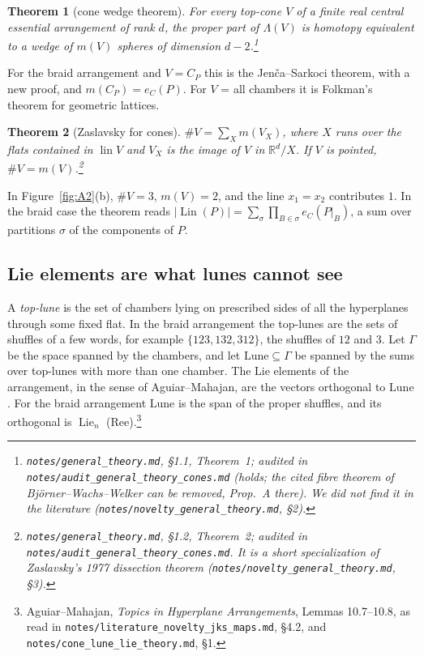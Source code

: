 \documentclass[11pt]{article}
\newtheorem{theorem}{Theorem}
\theoremstyle{definition}
\theoremstyle{remark}
\newcommand{\Lin}{\operatorname{Lin}}
\newcommand{\Lie}{\operatorname{Lie}}
\newcommand{\lin}{\operatorname{lin}}
\newcommand{\Lune}{\mathrm{Lune}}
\newcommand{\src}[1]{\nolinkurl{#1}}
\newcommand{\tagbox}[1]{\leavevmode\marginpar{\raggedright\fbox{\parbox{0.66in}{\centering\scriptsize\sffamily #1}}}}
\newcommand{\PROVEN}{\tagbox{PROVEN\\AUDITED}}
\newcommand{\CITED}{\tagbox{CLASSICAL\\(CITED)}}
\begin{document}
\begin{theorem}[cone wedge theorem]\label{thm:wedge}\PROVEN
For every top-cone $V$ of a finite real central essential arrangement of
rank $d$, the proper part of $\Lambda(V)$ is homotopy equivalent to a wedge
of $m(V)$ spheres of dimension $d-2$.\footnote{\src{notes/general_theory.md},
\S1.1, Theorem~1; audited in \src{notes/audit_general_theory_cones.md}
(holds; the cited fibre theorem of Bj\"orner--Wachs--Welker can be removed,
Prop.~A there). We did not find it in the literature
(\src{notes/novelty_general_theory.md}, \S2).}
\end{theorem}

For the braid arrangement and $V=C_P$ this is the Jen\v{c}a--Sarkoci theorem,
with a new proof, and $m(C_P)=e_C(P)$. For $V$ = all chambers it is Folkman's
theorem for geometric lattices.

\begin{theorem}[Zaslavsky for cones]\PROVEN
$\#V=\sum_X m(V_X)$, where $X$ runs over the flats contained in $\lin V$ and
$V_X$ is the image of $V$ in $\mathbb R^d/X$. If $V$ is pointed,
$\#V=m(V)$.\footnote{\src{notes/general_theory.md}, \S1.2, Theorem~2;
audited in \src{notes/audit_general_theory_cones.md}. It is a short
specialization of Zaslavsky's 1977 dissection theorem
(\src{notes/novelty_general_theory.md}, \S3).}
\end{theorem}

In Figure~\ref{fig:A2}(b), $\#V=3$, $m(V)=2$, and the line $x_1=x_2$
contributes $1$. In the braid case the theorem reads
$|\Lin(P)|=\sum_\sigma\prod_{B\in\sigma}e_C(P|_B)$, a sum over partitions
$\sigma$ of the components of $P$.

\subsection{Lie elements are what lunes cannot see}

A \emph{top-lune} is the set of chambers lying on prescribed sides of all the
hyperplanes through some fixed flat. In the braid arrangement the top-lunes
are the sets of shuffles of a few words, for example $\{123,132,312\}$, the
shuffles of $12$ and $3$. Let $\Gamma$ be the space spanned by the chambers,
and let $\Lune\subseteq\Gamma$ be spanned by the sums over top-lunes with more
than one chamber. The Lie elements of the arrangement, in the sense of
Aguiar--Mahajan, are the vectors orthogonal to $\Lune$. For the braid
arrangement $\Lune$ is the span of the proper shuffles, and its orthogonal is
$\Lie_n$ (Ree).\footnote{Aguiar--Mahajan, \emph{Topics in Hyperplane
Arrangements}, Lemmas 10.7--10.8, as read in
\src{notes/literature_novelty_jks_maps.md}, \S4.2, and
\src{notes/cone_lune_lie_theory.md}, \S1.}\CITED
\end{document}
